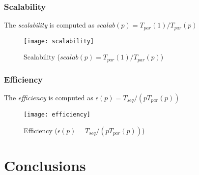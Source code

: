 \documentclass[]{article}
\begin{document}
\subsubsection{Scalability}
The \emph{scalability} is computed as $\mathit{scalab}(p) = T_{par}(1)/T_{par}(p)$
\begin{figure}[H]
	\centering
	\texttt{[image: scalability]}
	\caption{Scalability ($\mathit{scalab}(p) = T_{par}(1)/T_{par}(p)$)}
	\label{fig:scalab}
\end{figure}

\subsubsection{Efficiency}
The \emph{efficiency} is computed as $\epsilon(p) = T_{seq}/(pT_{par}(p))$
\begin{figure}[H]
	\centering
	\texttt{[image: efficiency]}
	\caption{Efficiency ($\epsilon(p) = T_{seq}/(pT_{par}(p))$)}
	\label{fig:effic}
\end{figure}

\section{Conclusions}
\label{sec:conclusion}
\end{document}
